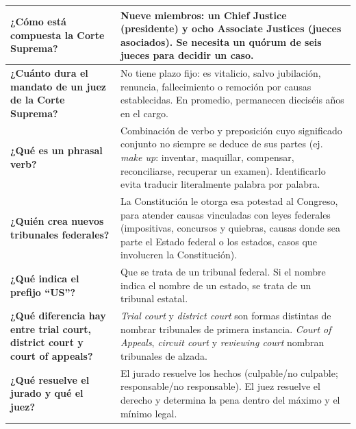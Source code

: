 \documentclass[12pt,oneside]{book}
\begin{document}
\begin{table}[H]
\begin{tabularx}{\textwidth}{
    >{\raggedright\arraybackslash}p{}
    >{\raggedright\arraybackslash}X
}
\midrule

\textbf{¿Cómo está compuesta la Corte Suprema?} &
Nueve miembros: un Chief Justice (presidente) y ocho Associate Justices (jueces asociados). Se necesita un quórum de seis jueces para decidir un caso. \\

\midrule

\textbf{¿Cuánto dura el mandato de un juez de la Corte Suprema?} &
No tiene plazo fijo: es vitalicio, salvo jubilación, renuncia, fallecimiento o remoción por causas establecidas. En promedio, permanecen dieciséis años en el cargo. \\

\midrule

\textbf{¿Qué es un phrasal verb?} &
Combinación de verbo y preposición cuyo significado conjunto no siempre se deduce de sus partes (ej. \textit{make up}: inventar, maquillar, compensar, reconciliarse, recuperar un examen). Identificarlo evita traducir literalmente palabra por palabra. \\

\midrule

\textbf{¿Quién crea nuevos tribunales federales?} &
La Constitución le otorga esa potestad al Congreso, para atender causas vinculadas con leyes federales (impositivas, concursos y quiebras, causas donde sea parte el Estado federal o los estados, casos que involucren la Constitución). \\

\midrule

\textbf{¿Qué indica el prefijo ``US''?} &
Que se trata de un tribunal federal. Si el nombre indica el nombre de un estado, se trata de un tribunal estatal. \\

\midrule

\textbf{¿Qué diferencia hay entre trial court, district court y court of appeals?} &
\textit{Trial court} y \textit{district court} son formas distintas de nombrar tribunales de primera instancia. \textit{Court of Appeals}, \textit{circuit court} y \textit{reviewing court} nombran tribunales de alzada. \\

\midrule

\textbf{¿Qué resuelve el jurado y qué el juez?} &
El jurado resuelve los hechos (culpable/no culpable; responsable/no responsable). El juez resuelve el derecho y determina la pena dentro del máximo y el mínimo legal. \\


\end{tabularx}
\end{table}
\end{document}
